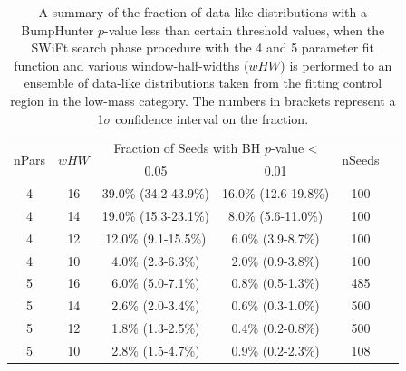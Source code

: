 \begin{table}[!ht]
\centering
\begin{tabular}{|c|c||c|c|c|c|}
  \hline
\multirow{2}{*}{nPars} & \multirow{2}{*}{$wHW$} &\multicolumn{2}{c|}{Fraction of Seeds with BH $p$-value \textless} &  \multirow{2}{*}{nSeeds} \\ \cline{3-4} 
                       &                     & 0.05                & 0.01            &        \\ 
  \hline
  4 &   16&  39.0\% (34.2-43.9\%) & 16.0\% (12.6-19.8\%) &  100  \\
  4 &   14&  19.0\% (15.3-23.1\%) &  8.0\% (5.6-11.0\%)  &  100  \\
  4 &   12&  12.0\% (9.1-15.5\%)  &  6.0\% (3.9-8.7\%)   &  100  \\
  4 &   10&  4.0\% (2.3-6.3\%)    &  2.0\% (0.9-3.8\%)   &  100  \\
  \hline
  5 &   16&   6.0\% (5.0-7.1\%)  &  0.8\% (0.5-1.3\%)   &  485  \\
  5 &   14&   2.6\% (2.0-3.4\%)  &  0.6\% (0.3-1.0\%)   &  500  \\
  5 &   12&   1.8\% (1.3-2.5\%)  &  0.4\% (0.2-0.8\%)    &  500  \\
  5 &   10&   2.8\% (1.5-4.7\%)  &  0.9\% (0.2-2.3\%)    &  108  \\
  \hline
\end{tabular}
\vspace{10pt}
\caption{\label{tab:bumpH_lm_spuriousSignal}
  A summary of the fraction of data-like distributions 
  with a {\sc BumpHunter} $p$-value less than certain threshold values,
  when the SWiFt search phase procedure with the 4 and 5 parameter fit function
  and various window-half-widths ($wHW$) is performed to an ensemble of data-like distributions
  taken from the fitting control region in the low-mass category.
  The numbers in brackets represent a 1$\sigma$ confidence interval on the fraction.}
\end{table}


